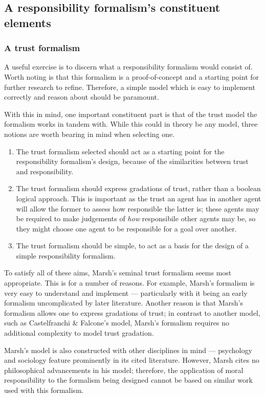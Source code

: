 \subsection{A responsibility formalism's constituent elements}
\subsubsection{A trust formalism}
A useful exercise is to discern what a responsibility formalism would consist of. Worth noting is that this formalism is a proof-of-concept and a starting point for further research to refine. Therefore, a simple model which is easy to implement correctly and reason about should be paramount.\par

With this in mind, one important constituent part is that of the trust model the formalism works in tandem with. While this could in theory be any model, three notions are worth bearing in mind when selecting one.
\begin{enumerate}
    \item The trust formalism selected should act as a starting point for the responsibility formalism's design, because of the similarities between trust and responsibility.
    \item The trust formalism should express gradations of trust, rather than a boolean logical approach. This is important as the trust an agent has in another agent will allow the former to assess how responsible the latter is; these agents may be required to make judgements of \emph{how} responsibile other agents may be, so they might choose one agent to be responsible for a goal over another.
    \item The trust formalism should be simple, to act as a basis for the design of a simple responsibility formalism.
\end{enumerate}

To satisfy all of these aims, Marsh's seminal trust formalism seems most appropriate. This is for a number of reasons. For example, Marsh's formalism is very easy to understand and implement --- particularly with it being an early formalism uncomplicated by later literature. Another reason is that Marsh's formalism allows one to express gradations of trust; in contrast to another model, such as Castelfranchi \& Falcone's model, Marsh's formalism requires no additional complexity to model trust gradation.\par

Marsh's model is also constructed with other disciplines in mind --- psychology and sociology feature prominently in its cited literature. However, Marsh cites no philosophical advancements in his model; therefore, the application of moral responsibility to the formalism being designed cannot be based on similar work used with this formalism.\par

